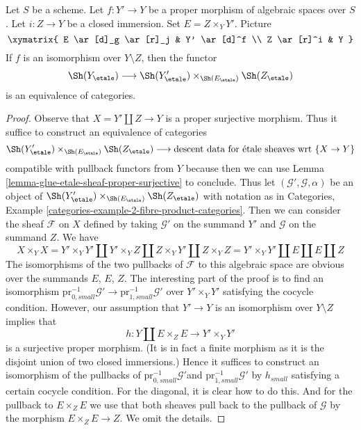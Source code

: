 \begin{lemma}
\label{lemma-glue-etale-sheaf-modification}
Let $S$ be a scheme. Let $f : Y' \to Y$ be a proper morphism of
algebraic spaces over $S$. Let $i : Z \to Y$
be a closed immersion. Set $E = Z \times_Y Y'$. Picture
$$
\xymatrix{
E \ar[d]_g \ar[r]_j & Y' \ar[d]^f \\
Z \ar[r]^i & Y
}
$$
If $f$ is an isomorphism over $Y \setminus Z$, then the functor
$$
\Sh(Y_\etale)
\longrightarrow
\Sh(Y'_\etale) \times_{\Sh(E_\etale)} \Sh(Z_\etale)
$$
is an equivalence of categories.
\end{lemma}

\begin{proof}
Observe that $X = Y' \coprod Z \to Y$ is a proper surjective morphism.
Thus it suffice to construct an equivalence of categories
$$
\Sh(Y'_\etale) \times_{\Sh(E_\etale)} \Sh(Z_\etale)
\longrightarrow
\text{descent data for \'etale sheaves wrt }\{X \to Y\}
$$
compatible with pullback functors from $Y$
because then we can use Lemma \ref{lemma-glue-etale-sheaf-proper-surjective}
to conclude. Thus let $(\mathcal{G}', \mathcal{G}, \alpha)$ be an
object of $\Sh(Y'_\etale) \times_{\Sh(E_\etale)} \Sh(Z_\etale)$ with
notation as in Categories, Example
\ref{categories-example-2-fibre-product-categories}.
Then we can consider the sheaf $\mathcal{F}$ on $X$ defined
by taking $\mathcal{G}'$ on the summand $Y'$ and $\mathcal{G}$
on the summand $Z$. We have
$$
X \times_Y X = Y' \times_Y Y' \amalg
Y' \times_Y Z \amalg Z \times_Y Y' \amalg Z \times_Y Z =
Y' \times_Y Y' \amalg E \amalg E \amalg Z
$$
The isomorphisms of the two pullbacks of $\mathcal{F}$ to this algebraic
space are obvious over the summands $E$, $E$, $Z$. The interesting
part of the proof is to find an isomorphism
$\text{pr}_{0, small}^{-1}\mathcal{G}' \to
\text{pr}_{1, small}^{-1}\mathcal{G}'$
over $Y' \times_Y Y'$ satisfying the cocycle condition.
However, our assumption that $Y' \to Y$ is an isomorphism
over $Y \setminus Z$ implies that
$$
h : Y \coprod E \times_Z E \longrightarrow Y' \times_Y Y'
$$
is a surjective proper morphism. (It is in fact a finite morphism
as it is the disjoint union of two closed immersions.)
Hence it suffices to construct an isomorphism of the pullbacks
of $\text{pr}_{0, small}^{-1}\mathcal{G}'$and
$\text{pr}_{1, small}^{-1}\mathcal{G}'$ by $h_{small}$ satisfying
a certain cocycle condition. For the diagonal, it is clear
how to do this. And for the pullback to $E \times_Z E$
we use that both sheaves pull back to the pullback of
$\mathcal{G}$ by the morphism $E \times_Z E \to Z$.
We omit the details.
\end{proof}







